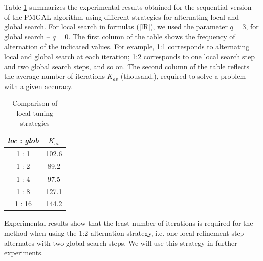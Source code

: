 \documentclass[
11pt,%
tightenlines,%
twoside,%
onecolumn,%
nofloats,%
nobibnotes,%
nofootinbib,%
superscriptaddress,%
noshowpacs,%
centertags]%
{revtex4}
\begin{document}
Table \ref{tab:2} summarizes the experimental results obtained for the sequential version of the PMGAL algorithm using different strategies for alternating local and global search. For local search in formulas  (\ref{lR}), we used the parameter $q=3$, for global search -- $q=0$. The first column of the table shows the frequency of alternation of the indicated values. For example, 1:1 corresponds to alternating local and global search at each iteration; 1:2 corresponds to one local search step and two global search steps, and so on. The second column of the table reflects the average number of iterations  $K_{av}$ (thousand.), required to solve a problem with a given accuracy.

\begin{table}[ht]
    \caption{Comparison of local tuning strategies}
    \label{tab:2}
    \center
    \begin{tabular}{|c|c|}
        \hline
        \textit{loc} : \textit{glob} & $K_{av}$   \\
        \hline
        1 : 1 & 102.6\\
        1 : 2 & 89.2\\
        1 : 4 & 97.5\\
        1 : 8 & 127.1\\
        1 : 16 & 144.2\\
        \hline
    \end{tabular}
\end{table}


Experimental results show that the least number of iterations is required for the method when using the 1:2 alternation strategy, i.e. one local refinement step alternates with two global search steps. We will use this strategy in further experiments.

\end{document}
